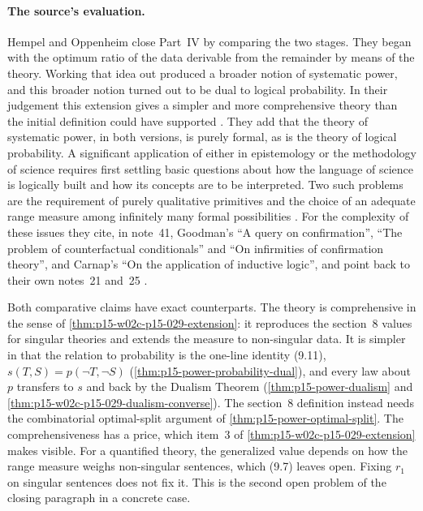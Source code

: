 \paragraph{The source's evaluation.}
Hempel and Oppenheim close Part~IV by comparing the two stages. They
began with the optimum ratio of the data derivable from the remainder by
means of the theory. Working that idea out produced a broader notion of
systematic power, and this broader notion turned out to be dual to
logical probability. In their judgement this extension gives a simpler and more
comprehensive theory than the initial definition could have supported
\cite[p.~173]{HempelOppenheim1948Explanation}. They add that the theory
of systematic power, in both versions, is purely formal, as is the theory
of logical probability. A significant application of either in
epistemology or the methodology of science requires first settling basic
questions about how the language of science is logically built and how
its concepts are to be interpreted. Two such problems are the requirement of
purely qualitative primitives and the choice of an adequate range
measure among infinitely many formal possibilities
\cite[p.~173]{HempelOppenheim1948Explanation}. For the complexity of
these issues they cite, in note~41, Goodman's ``A query on
confirmation'', ``The problem of counterfactual conditionals'' and ``On
infirmities of confirmation theory'', and Carnap's ``On the application
of inductive logic'', and point back to their own notes~21 and~25
\cite[p.~173, n.~41]{HempelOppenheim1948Explanation}.

Both comparative claims have exact counterparts. The theory is
comprehensive in the sense of \cref{thm:p15-w02c-p15-029-extension}: it
reproduces the section~8 values for singular theories and extends the
measure to non-singular data. It is simpler in that the relation to
probability is the one-line identity (9.11),
\(s(T,S)=p(\neg T,\neg S)\) (\cref{thm:p15-power-probability-dual}), and
every law about \(p\) transfers to \(s\) and back by the Dualism Theorem
(\cref{thm:p15-power-dualism} and \cref{thm:p15-w02c-p15-029-dualism-converse}).
The section~8 definition instead needs the combinatorial optimal-split
argument of \cref{thm:p15-power-optimal-split}. The comprehensiveness
has a price, which item~3 of \cref{thm:p15-w02c-p15-029-extension} makes
visible. For a quantified theory, the generalized value depends on how
the range measure weighs non-singular sentences, which (9.7) leaves
open. Fixing \(r_1\) on singular sentences does not fix it. This is the
second open problem of the closing paragraph in a concrete case.

